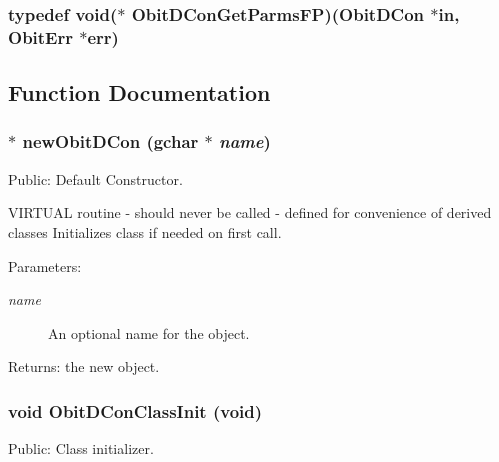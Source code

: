 \subsubsection{\setlength{\rightskip}{0pt plus 5cm}typedef void($\ast$ {\bf Obit\-DCon\-Get\-Parms\-FP})({\bf Obit\-DCon} $\ast$in, {\bf Obit\-Err} $\ast$err)}\label{ObitDCon_8h_a3}




\subsection{Function Documentation}
\subsubsection{$\ast$ new\-Obit\-DCon (gchar $\ast$ {\em name})}\label{ObitDCon_8h_a6}


Public: Default Constructor. 

VIRTUAL routine - should never be called - defined for convenience of derived classes Initializes class if needed on first call. \begin{Desc}
\item[Parameters:]
\begin{description}
\item[{\em name}]An optional name for the object. \end{description}
\end{Desc}
\begin{Desc}
\item[Returns:]the new object. \end{Desc}
\subsubsection{\setlength{\rightskip}{0pt plus 5cm}void Obit\-DCon\-Class\-Init (void)}\label{ObitDCon_8h_a5}


Public: Class initializer. 

